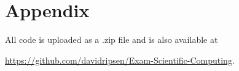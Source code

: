 \section{Appendix}
All code is uploaded as a .zip file and is also available at\\
\begin{center}
    \url{https://github.com/davidripsen/Exam-Scientific-Computing}.
\end{center}